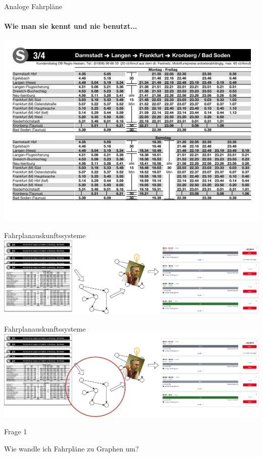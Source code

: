 \begin{frame}{Analoge Fahrpläne}
\framesubtitle{Wie man sie kennt und nie benutzt...}
	\begin{center}
		\includegraphics[width=.8\linewidth]{images/fahrplan-s3s4.jpg}
	\end{center}
\end{frame}

\begin{frame}{Fahrplanauskunftssysteme}
	\vspace{4em}
	\includegraphics[width=\linewidth]{images/fahrplan-zu-auskunftssystem.pdf}
\end{frame}

\begin{frame}{Fahrplanauskunftssysteme}
	\vspace{3em}
	\includegraphics[width=\linewidth]{images/fahrplan-zu-auskunftssystem-2.pdf}
\end{frame}


\begin{frame}{Frage 1}
	\vspace{7em}
	\begin{center}
		\begin{Large}
			Wie wandle ich Fahrpläne zu Graphen um?
		\end{Large}
	\end{center}
\end{frame}

